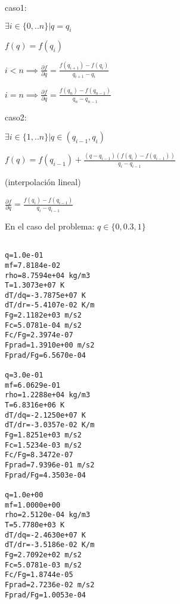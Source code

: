 \documentclass[10pt]{book}
\begin{document}
\begin{description}
\item caso1:

$\exists i \in \{0,..n\} | q = q_i$

\begin{description}
\item $f(q) = f(q_i)$
\begin{description}
\item $i<n \implies \frac {\partial f}{\partial q} = \frac {f(q_{i+1}) - f(q_i)}{q_{i+1} - q_i}$
\item $i=n \implies \frac {\partial f}{\partial q} = \frac {f(q_{n}) - f(q_{n-1})}{q_{n} - q_{n-1}}$
\end{description}
\end{description}

\item caso2:

$\exists i \in \{1,..n\} | q \in (q_{i-1},q_i)$

\begin{description}

\item $f(q) = f(q_{i-1}) + \frac{(q  - q_{i-1})(f(q_i) - f(q_{i-1}))}{q_i - q_{i-1}}$

(interpolación lineal)

\item $ \frac {\partial f}{\partial q} = \frac {f(q_{i}) - f(q_{i-1})}{q_{i} - q_{i-1}}$
\end{description}

\end{description}
En el caso del problema: $q \in \{0, 0.3, 1\}$ 
\small

\begin{verbatim}

q=1.0e-01
mf=7.8184e-02
rho=8.7594e+04 kg/m3
T=1.3073e+07 K
dT/dq=-3.7875e+07 K
dT/dr=-5.4107e-02 K/m
Fg=2.1182e+03 m/s2
Fc=5.0781e-04 m/s2
Fc/Fg=2.3974e-07
Fprad=1.3910e+00 m/s2
Fprad/Fg=6.5670e-04

q=3.0e-01
mf=6.0629e-01
rho=1.2288e+04 kg/m3
T=6.8316e+06 K
dT/dq=-2.1250e+07 K
dT/dr=-3.0357e-02 K/m
Fg=1.8251e+03 m/s2
Fc=1.5234e-03 m/s2
Fc/Fg=8.3472e-07
Fprad=7.9396e-01 m/s2
Fprad/Fg=4.3503e-04

q=1.0e+00
mf=1.0000e+00
rho=2.5120e-04 kg/m3
T=5.7780e+03 K
dT/dq=-2.4630e+07 K
dT/dr=-3.5186e-02 K/m
Fg=2.7092e+02 m/s2
Fc=5.0781e-03 m/s2
Fc/Fg=1.8744e-05
Fprad=2.7236e-02 m/s2
Fprad/Fg=1.0053e-04


\end{verbatim}
\end{document}
